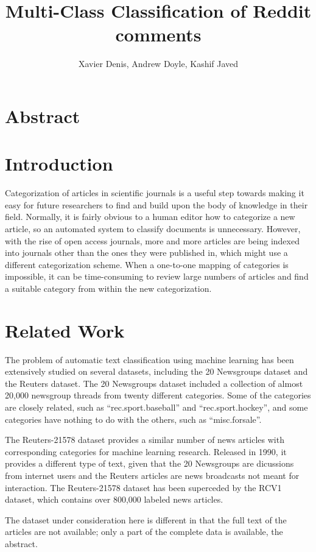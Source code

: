 \documentclass[10pt,twocolumn]{article}
\title {Multi-Class Classification of Reddit comments}
\author {Xavier Denis, Andrew Doyle, Kashif Javed}
\begin{document}
\section*{Abstract}

\section*{Introduction}

Categorization of articles in scientific journals is a useful step towards making it easy for future researchers to find and build upon the body of knowledge in their field.  Normally, it is fairly obvious to a human editor how to categorize a new article, so an automated system to classify documents is unnecessary.  However, with the rise of open access journals, more and more articles are being indexed into journals other than the ones they were published in, which might use a different categorization scheme.  When a one-to-one mapping of categories is impossible, it can be time-consuming to review large numbers of articles and find a suitable category from within the new categorization.

\section*{Related Work}

The problem of automatic text classification using machine learning has been extensively studied on several datasets, including the 20 Newsgroups dataset and the Reuters dataset.  The 20 Newsgroups dataset included a collection of almost 20,000 newsgroup threads from twenty different categories.  Some of the categories are closely related, such as ``rec.sport.baseball'' and ``rec.sport.hockey'', and some categories have nothing to do with the others, such as ``misc.forsale''.

The Reuters-21578 dataset provides a similar number of news articles with corresponding categories for machine learning research.  Released in 1990, it provides a different type of text, given that the 20 Newsgroups are dicussions from internet users and the Reuters articles are news broadcasts not meant for interaction.  The Reuters-21578 dataset has been superceded by the RCV1 dataset, which contains over 800,000 labeled news articles.

The dataset under consideration here is different in that the full text of the articles are not available; only a part of the complete data is available, the abstract.
\end{document}
